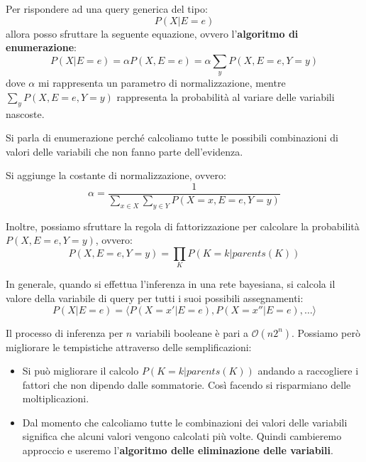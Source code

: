 Per rispondere ad una query generica del tipo:
\begin{equation*}
    P(X|E=e)
\end{equation*}
allora posso sfruttare la seguente equazione, ovvero l'\textbf{algoritmo di
    enumerazione}:
\begin{equation}
    P(X|E = e) = \alpha P(X,E = e) = \alpha \sum_{y} P(X,E = e, Y = y)
\end{equation}
dove $\alpha$ mi rappresenta un parametro di normalizzazione, mentre $\sum_{y}
    P(X,E = e, Y = y)$ rappresenta la probabilità al variare delle variabili nascoste.

Si parla di enumerazione perché calcoliamo tutte le possibili combinazioni di valori
delle variabili che non fanno parte dell'evidenza.
\begin{nota}
    Si aggiunge la costante di normalizzazione, ovvero:
    \begin{equation}
        \alpha = \frac{1}{\sum_{x\in X}\sum_{y\in Y}P(X = x, E=e,Y=y)}
    \end{equation}
\end{nota}
Inoltre, possiamo sfruttare la regola di fattorizzazione per calcolare la probabilità
$P(X,E=e,Y=y)$, ovvero:
\begin{equation}
    P(X,E=e,Y=y) = \prod_{K} P(K=k | parents(K))
\end{equation}

In generale, quando si effettua l'inferenza in una rete bayesiana, si calcola il
valore della variabile di query per tutti i suoi possibili assegnamenti:
\begin{equation*}
    P(X|E=e) = \langle P(X = x'|E = e), P(X = x''|E = e),\dots \rangle
\end{equation*}

Il processo di inferenza per $n$ variabili booleane è pari a $\mathcal{O}(n2^n)$.
Possiamo però migliorare le tempistiche attraverso delle semplificazioni:
\begin{itemize}
    \item Si può migliorare il calcolo $P(K=k | parents(K))$ andando a raccogliere
          i fattori che non dipendo dalle sommatorie. Così facendo si risparmiano
          delle moltiplicazioni.
    \item Dal momento che calcoliamo tutte le combinazioni dei valori delle
          variabili significa che alcuni valori vengono calcolati più volte.
          Quindi cambieremo approccio e useremo l'\textbf{algoritmo delle
              eliminazione delle variabili}.
\end{itemize}

